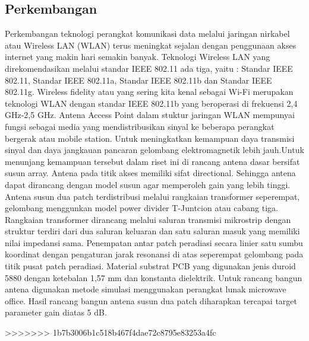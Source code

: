 \subsection {Perkembangan}
Perkembangan teknologi perangkat komunikasi data melalui jaringan nirkabel atau Wireless LAN (WLAN) terus meningkat sejalan dengan 
penggunaan akses internet yang makin hari semakin banyak. Teknologi Wireless LAN yang direkomendasikan melalui standar IEEE 802.11 
ada tiga, yaitu : Standar IEEE 802.11, Standar IEEE 802.11a, 
Standar IEEE 802.11b dan Standar IEEE 802.11g. Wireless fidelity atau yang sering 
kita kenal sebagai Wi-Fi merupakan teknologi WLAN dengan standar IEEE 802.11b yang beroperasi di frekuensi 2,4 GHz-2,5 GHz. Antena Access 
Point dalam stuktur jaringan WLAN mempunyai fungsi sebagai media yang mendistribusikan sinyal ke beberapa perangkat bergerak atau mobile 
station. Untuk meningkatkan kemampuan daya transmisi sinyal dan daya jangkauan pancaran gelombang elektromagnetik lebih jauh.Untuk 
menunjang kemampuan tersebut dalam riset ini di rancang antena dasar bersifat susun array. Antena pada titik akses memiliki sifat 
directional. Sehingga antena dapat dirancang dengan model susun agar memperoleh gain yang lebih tinggi. Antena susun dua patch 
terdistribusi melalui rangkaian transformer seperempat, gelombang menggunkan model power divider T-Juntcion atau cabang tiga. Rangkaian transformer 
dirancang melalui saluran transmisi mikrostrip dengan struktur terdiri dari dua saluran keluaran dan satu saluran masuk yang memiliki 
nilai impedansi sama. Penempatan antar patch peradiasi secara linier satu sumbu koordinat dengan pengaturan jarak resonansi di atas 
seperempat gelombang pada titik pusat patch peradiasi. Material substrat PCB yang digunakan jenis duroid 5880 dengan ketebalan 1,57 mm dan
konstanta dielektrik. Untuk rancang bangun antena digunakan metode simulasi menggunakan perangkat lunak microwave office. Hasil rancang bangun antena susun dua patch diharapkan tercapai target parameter gain diatas 5 dB.
 
 \cite {yustiyan2006analisa}
 \cite {arief2007teknologi}
 \cite {darsono2012rancang}
>>>>>>> 1b7b3006b1c518b467f4dae72c8795e83253a4fc
 \cite {yudianto2007jaringan}